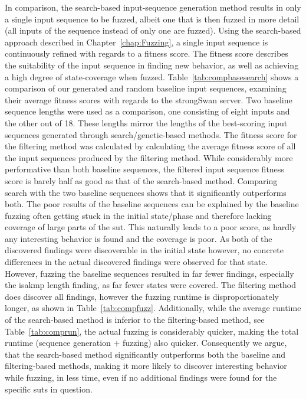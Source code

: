 In comparison, the search-based input-sequence generation method results in only a single input sequence to be fuzzed, albeit one that is then fuzzed in more detail (all inputs of the sequence instead of only one are fuzzed). Using the search-based approach described in Chapter~\ref{chap:Fuzzing}, a single input sequence is continuously refined with regards to a fitness score. The fitness score describes the suitability of the input sequence in finding new behavior, as well as achieving a high degree of state-coverage when fuzzed. Table~\ref{tab:compbasesearch} shows a comparison of our generated and random baseline input sequences, examining their average fitness scores with regards to the strongSwan server. Two baseline sequence lengths were used as a comparison, one consisting of eight inputs and the other out of 18. These lengths mirror the lengths of the best-scoring input sequences generated through search/genetic-based methods. The fitness score for the filtering method was calculated by calculating the average fitness score of all the input sequences produced by the filtering method. While considerably more performative than both baseline sequences, the filtered input sequence fitness score is barely half as good as that of the search-based method. Comparing search with the two baseline sequences shows that it significantly outperforms both. The poor results of the baseline sequences can be explained by the baseline fuzzing often getting stuck in the initial state/phase and therefore lacking coverage of large parts of the \ac{sut}. This naturally leads to a poor score, as hardly any interesting behavior is found and the coverage is poor. As both of the discovered findings were discoverable in the initial state however, no concrete differences in the actual discovered findings were observed for that state. However, fuzzing the baseline sequences resulted in far fewer findings, especially the \ac{isakmp} length finding, as far fewer states were covered. The filtering method does discover all findings, however the fuzzing runtime is disproportionately longer, as shown in Table~\ref{tab:compfuzz}. Additionally, while the average runtime of the search-based method is inferior to the filtering-based method, see Table~\ref{tab:comprun}, the actual fuzzing is considerably quicker, making the total runtime (sequence generation + fuzzing) also quicker. Consequently we argue, that the search-based method significantly outperforms both the baseline and filtering-based methods, making it more likely to discover interesting behavior while fuzzing, in less time, even if no additional findings were found for the specific \acp{sut} in question. 


